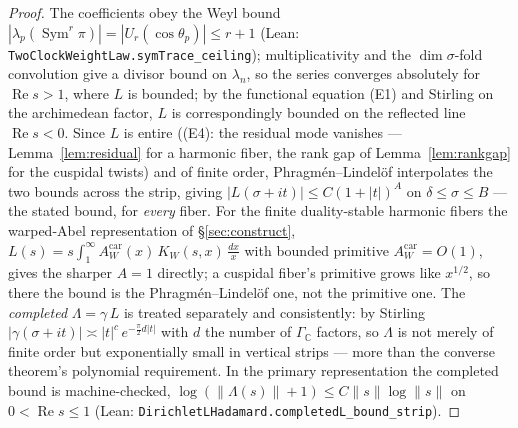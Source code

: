 \documentclass[11pt]{article}
\theoremstyle{definition}
\renewcommand{\Re}{\operatorname{Re}}
\newcommand{\Sym}{\operatorname{Sym}}
\begin{document}
\begin{proof}
The coefficients obey the Weyl bound $|\lambda_p(\Sym^r\pi)|=|U_r(\cos\theta_p)|\le r+1$ (Lean:
\texttt{TwoClockWeightLaw.symTrace\_ceiling}); multiplicativity and the $\dim\sigma$-fold convolution give a
divisor bound on $\lambda_n$, so the series converges absolutely for $\Re s>1$, where $L$ is bounded; by the
functional equation \textup{(E1)} and Stirling on the archimedean factor, $L$ is correspondingly bounded on
the reflected line $\Re s<0$. Since $L$ is entire (\textup{(E4)}: the residual mode vanishes ---
Lemma~\ref{lem:residual} for a harmonic fiber, the rank gap of Lemma~\ref{lem:rankgap} for the cuspidal
twists) and of finite order, Phragm\'en--Lindel\"of interpolates the two bounds across the strip, giving
$|L(\sigma+it)|\le C(1+|t|)^{A}$ on $\delta\le\sigma\le B$ --- the stated bound, for \emph{every} fiber. For
the finite duality-stable harmonic fibers the warped-Abel representation of \S\ref{sec:construct},
$L(s)=s\int_1^\infty A^{\mathrm{car}}_W(x)\,K_W(s,x)\,\tfrac{dx}{x}$ with bounded primitive
$A^{\mathrm{car}}_W=O(1)$, gives the sharper $A=1$ directly; a cuspidal fiber's primitive grows like
$x^{1/2}$, so there the bound is the Phragm\'en--Lindel\"of one, not the primitive one. The
\emph{completed} $\Lambda=\gamma\,L$ is treated separately and consistently: by Stirling
$|\gamma(\sigma+it)|\asymp|t|^{c}\,e^{-\frac{\pi}{2}d|t|}$ with $d$ the number of $\Gamma_{\mathbb C}$
factors, so $\Lambda$ is not merely of finite order but exponentially small in vertical strips --- more
than the converse theorem's polynomial requirement. In the primary representation the completed bound is
machine-checked, $\log(\|\Lambda(s)\|+1)\le C\|s\|\log\|s\|$ on $0<\Re s\le1$ (Lean:
\texttt{DirichletLHadamard.completedL\_bound\_strip}).
\end{proof}
\end{document}
